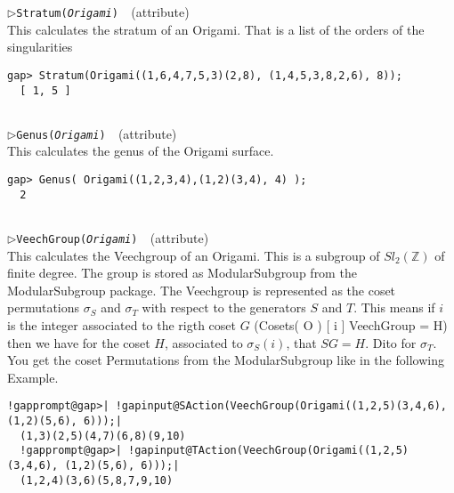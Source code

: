 \documentclass[a4paper,11pt]{report}
\begin{document}
{{{\begin{Verbatim}[commandchars=!@|,fontsize=\small,frame=single,label=Example]
\end{Verbatim}
 \noindent\textcolor{FuncColor}{$\triangleright$\enspace\texttt{Stratum({\mdseries\slshape Origami})
\label{Stratum}
}\hfill{\scriptsize (attribute)}}\\


 This calculates the stratum of an Origami. That is a list of the orders of the
singularities 
\begin{Verbatim}[commandchars=!@|,fontsize=\small,frame=single,label=Example]
            gap> Stratum(Origami((1,6,4,7,5,3)(2,8), (1,4,5,3,8,2,6), 8));
  [ 1, 5 ]
          
\end{Verbatim}
 \noindent\textcolor{FuncColor}{$\triangleright$\enspace\texttt{Genus({\mdseries\slshape Origami})
\label{Genus}
}\hfill{\scriptsize (attribute)}}\\


 This calculates the genus of the Origami surface. 
\begin{Verbatim}[commandchars=!@|,fontsize=\small,frame=single,label=Example]
            gap> Genus( Origami((1,2,3,4),(1,2)(3,4), 4) );
  2
          
\end{Verbatim}
 \noindent\textcolor{FuncColor}{$\triangleright$\enspace\texttt{VeechGroup({\mdseries\slshape Origami})
\label{VeechGroup}
}\hfill{\scriptsize (attribute)}}\\


 This calculates the Veechgroup of an Origami. This is a subgroup of $Sl_2(\mathbb{Z})$ of finite degree. The group is stored as ModularSubgroup from the \textsf{ModularSubgroup} package. The Veechgroup is represented as the coset permutations $\sigma_S$ and $\sigma_T$ with respect to the generators $S$ and $T$. This means if $i$ is the integer associated to the rigth coset $G$ (Cosets( O ) [ i ] VeechGroup = H) then we have for the coset $H$, associated to $\sigma_S(i)$, that $SG = H$. Dito for $\sigma_T$. You get the coset Permutations from the ModularSubgroup like in the
following Example. 
\begin{Verbatim}[commandchars=!@|,fontsize=\small,frame=single,label=Example]
  !gapprompt@gap>| !gapinput@SAction(VeechGroup(Origami((1,2,5)(3,4,6), (1,2)(5,6), 6)));|
  (1,3)(2,5)(4,7)(6,8)(9,10)
  !gapprompt@gap>| !gapinput@TAction(VeechGroup(Origami((1,2,5)(3,4,6), (1,2)(5,6), 6)));|
  (1,2,4)(3,6)(5,8,7,9,10)
          

\end{Verbatim}}}}
\end{document}

